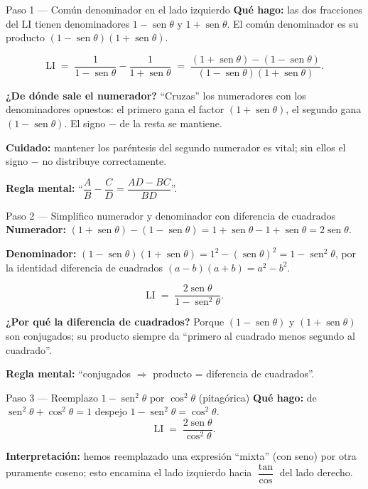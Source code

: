 \documentclass[11pt]{article}
\DeclareMathOperator{\sen}{sen}
\begin{document}
\begin{paso}{Paso 1 --- Común denominador en el lado izquierdo}
\textbf{Qué hago:} las dos fracciones del LI tienen denominadores $1-\sen\theta$ y $1+\sen\theta$. El común denominador es su producto $(1-\sen\theta)(1+\sen\theta)$.

\[
\text{LI} \;=\; \dfrac{1}{1-\sen\theta}-\dfrac{1}{1+\sen\theta}
\;=\; \dfrac{(1+\sen\theta)-(1-\sen\theta)}{(1-\sen\theta)(1+\sen\theta)}.
\]

\textbf{¿De dónde sale el numerador?} ``Cruzas'' los numeradores con los denominadores opuestos: el primero gana el factor $(1+\sen\theta)$, el segundo gana $(1-\sen\theta)$. El signo $-$ de la resta se mantiene.

\textbf{Cuidado:} mantener los paréntesis del segundo numerador es vital; sin ellos el signo $-$ no distribuye correctamente.

\textbf{Regla mental:} ``$\dfrac{A}{B}-\dfrac{C}{D}=\dfrac{AD-BC}{BD}$''.
\end{paso}

\begin{paso}{Paso 2 --- Simplifico numerador y denominador con diferencia de cuadrados}
\textbf{Numerador:} $(1+\sen\theta)-(1-\sen\theta)=1+\sen\theta-1+\sen\theta=2\sen\theta$.

\textbf{Denominador:} $(1-\sen\theta)(1+\sen\theta)=1^2-(\sen\theta)^2=1-\sen^2\theta$, por la identidad diferencia de cuadrados $(a-b)(a+b)=a^2-b^2$.

\[
\text{LI} \;=\; \dfrac{2\sen\theta}{1-\sen^2\theta}.
\]

\textbf{¿Por qué la diferencia de cuadrados?} Porque $(1-\sen\theta)$ y $(1+\sen\theta)$ son conjugados; su producto siempre da ``primero al cuadrado menos segundo al cuadrado''.

\textbf{Regla mental:} ``conjugados $\Rightarrow$ producto = diferencia de cuadrados''.
\end{paso}

\begin{paso}{Paso 3 --- Reemplazo $1-\sen^2\theta$ por $\cos^2\theta$ (pitagórica)}
\textbf{Qué hago:} de $\sen^2\theta+\cos^2\theta=1$ despejo $1-\sen^2\theta=\cos^2\theta$.
\[
\text{LI} \;=\; \dfrac{2\sen\theta}{\cos^2\theta}.
\]

\textbf{Interpretación:} hemos reemplazado una expresión ``mixta'' (con seno) por otra puramente coseno; esto encamina el lado izquierdo hacia $\dfrac{\tan}{\cos}$ del lado derecho.
\end{paso}
\end{document}
